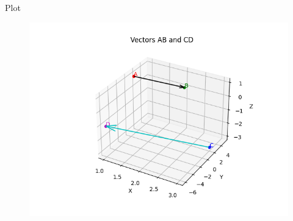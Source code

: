 \documentclass{beamer}
\begin{document}
                                                                                                                \begin{frame}{Plot}
                                                                                                                \begin{figure}
                                                                                                                    \centering
                                                                                                                        \includegraphics[width=0.8\columnwidth]{Figs/Figure.png}
                                                                                                                        \end{figure}
                                                                                                                        \end{frame}

                                                                                                                                
\end{document}
